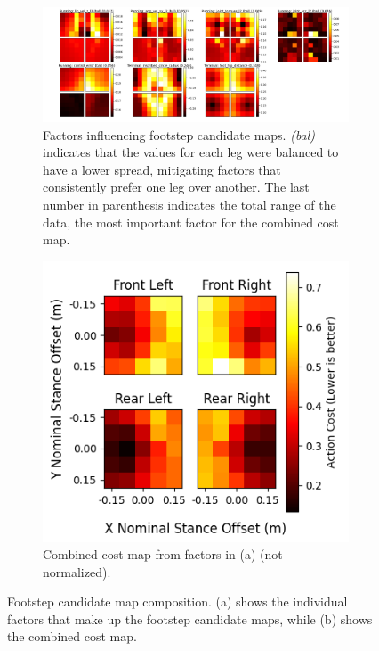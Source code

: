 \begin{figure}[H]
  \centering
  \begin{subfigure}[T]{0.65\textwidth}
    \centering
    \includegraphics[width=\textwidth]{images/data/training/costmap-composition/elements.png}
    \caption{Factors influencing footstep candidate maps. \textit{(bal)}
      indicates that the values for each leg were balanced to have a
      lower spread, mitigating factors that consistently prefer one leg
      over another. The last number in parenthesis indicates the total
    range of the data, the most important factor for the combined cost map.}
    \label{fig:data-costmap-composition-elements}
  \end{subfigure}
  \hfill
  \begin{subfigure}[T]{0.3\textwidth}
    \centering
    \includegraphics[width=\textwidth]{images/data/training/costmap-composition/combined.png}
    \caption{Combined cost map from factors in (a) (not normalized).}
    \label{fig:data-costmap-composition-combined}
  \end{subfigure}
  \hfill
  \caption{Footstep candidate map composition. (a) shows the individual
    factors that make up the footstep candidate maps, while (b) shows the
  combined cost map.}
  \label{fig:data-costmap-composition}
\end{figure}

